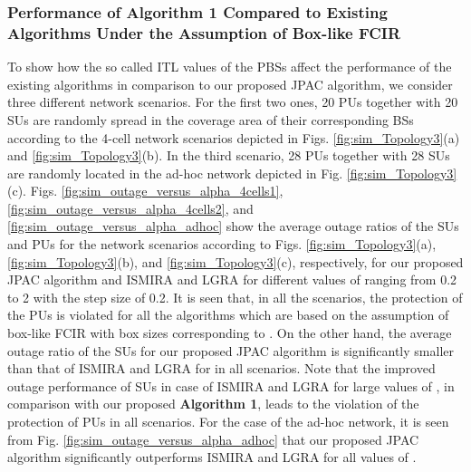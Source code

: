 \documentclass[journal,twoside]{IEEEtran}
\begin{document}
\subsubsection{Performance of \textbf{Algorithm 1} Compared to Existing Algorithms Under the Assumption of Box-like FCIR}
	To show how the so called ITL values of the PBSs affect the performance of the existing algorithms in comparison to our proposed JPAC algorithm, we consider three different network scenarios. For the first two ones, 20  PUs together with 20  SUs are randomly spread in the coverage area of their corresponding BSs according to the 4-cell network scenarios depicted in Figs. \ref{fig:sim_Topology3}(a) and \ref{fig:sim_Topology3}(b). In the third scenario, 28  PUs together with 28 SUs are randomly located in the ad-hoc network depicted in Fig. \ref{fig:sim_Topology3}(c). Figs. \ref{fig:sim_outage_versus_alpha_4cells1}, \ref{fig:sim_outage_versus_alpha_4cells2}, and \ref{fig:sim_outage_versus_alpha_adhoc} show the average outage ratios of the SUs and PUs for the network scenarios according to Figs. \ref{fig:sim_Topology3}(a), \ref{fig:sim_Topology3}(b), and \ref{fig:sim_Topology3}(c), respectively, for our proposed JPAC algorithm and ISMIRA and LGRA for different values of  ranging from 0.2 to 2 with the step size of 0.2. It is seen that, in all the scenarios, the protection of the PUs is violated for all the algorithms which are  based on the assumption of  box-like FCIR with box sizes corresponding to . On the other hand,  the average outage ratio of the SUs for our proposed JPAC algorithm is significantly smaller than that of ISMIRA and LGRA for  in all scenarios. Note that the improved outage performance of SUs in case of ISMIRA and LGRA for large values of , in  comparison with our proposed \textbf{Algorithm 1}, leads to the violation of the  protection of PUs in all scenarios. For the case of the ad-hoc network, it is seen from Fig. \ref{fig:sim_outage_versus_alpha_adhoc} that our proposed JPAC algorithm significantly outperforms ISMIRA and LGRA for all values of .
	
\end{document}
